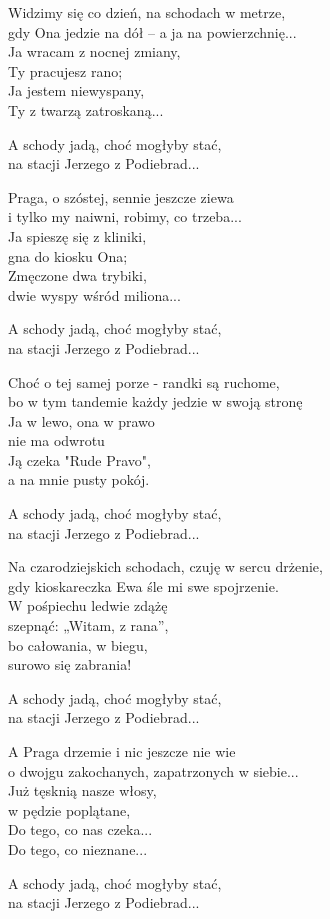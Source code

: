\begin{text}
    Widzimy się co dzień, na schodach w metrze,\\
    gdy Ona jedzie na dół – a ja na powierzchnię...\\
    Ja wracam z nocnej zmiany,\\
    Ty pracujesz rano;\\
    Ja jestem niewyspany,\\
    Ty z twarzą zatroskaną...

    A schody jadą, choć mogłyby stać,\\
    na stacji Jerzego z Podiebrad...

    Praga, o szóstej, sennie jeszcze ziewa\\
    i tylko my naiwni, robimy, co trzeba...\\
    Ja spieszę się z kliniki,\\
    gna do kiosku Ona;\\
    Zmęczone dwa trybiki,\\
    dwie wyspy wśród miliona...

    A schody jadą, choć mogłyby stać,\\
    na stacji Jerzego z Podiebrad...

    Choć o tej samej porze - randki są ruchome,\\
    bo w tym tandemie każdy jedzie w swoją stronę\\
    Ja w lewo, ona w prawo\\
    nie ma odwrotu\\
    Ją czeka "Rude Pravo",\\
    a na mnie pusty pokój.

    A schody jadą, choć mogłyby stać,\\
    na stacji Jerzego z Podiebrad...

    Na czarodziejskich schodach, czuję w sercu drżenie,\\
    gdy kioskareczka Ewa śle mi swe spojrzenie.\\
    W pośpiechu ledwie zdążę\\
    szepnąć: „Witam, z rana”,\\
    bo całowania, w biegu,\\
    surowo się zabrania!

    A schody jadą, choć mogłyby stać,\\
    na stacji Jerzego z Podiebrad...

    A Praga drzemie i nic jeszcze nie wie\\
    o dwojgu zakochanych, zapatrzonych w siebie...\\
    Już tęsknią nasze włosy,\\
    w pędzie poplątane,\\
    Do tego, co nas czeka...\\
    Do tego, co nieznane...

    A schody jadą, choć mogłyby stać,\\
    na stacji Jerzego z Podiebrad...
\end{text}
\begin{chord}

\end{chord}